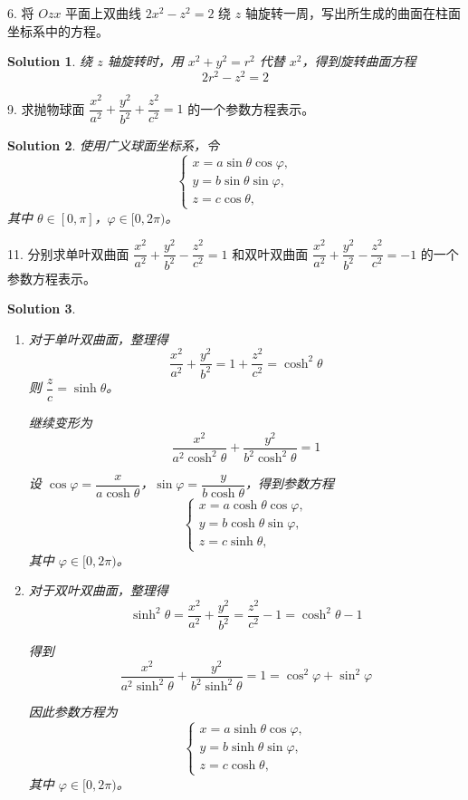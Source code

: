 \documentclass[a4paper,12pt]{article}
\newtheorem*{sol}{Solution}
\begin{document}
6. 将 $Ozx$ 平面上双曲线 $2x^2 - z^2 = 2$ 绕 $z$ 轴旋转一周，写出所生成的曲面在柱面坐标系中的方程。

\begin{sol}
    绕 $z$ 轴旋转时，用 $x^2 + y^2 = r^2$ 代替 $x^2$，得到旋转曲面方程
    $$2r^2 - z^2 = 2$$
\end{sol}

9. 求抛物球面 $\dfrac{x^2}{a^2} + \dfrac{y^2}{b^2} + \dfrac{z^2}{c^2} = 1$ 的一个参数方程表示。

\begin{sol}
    使用广义球面坐标系，令
    $$\begin{cases}
            x = a\sin\theta\cos\varphi, \\
            y = b\sin\theta\sin\varphi, \\
            z = c\cos\theta,
        \end{cases}$$
    其中 $\theta \in [0, \pi]$，$\varphi \in [0, 2\pi)$。
\end{sol}

11. 分别求单叶双曲面 $\dfrac{x^2}{a^2} + \dfrac{y^2}{b^2} - \dfrac{z^2}{c^2} = 1$ 和双叶双曲面 $\dfrac{x^2}{a^2} + \dfrac{y^2}{b^2} - \dfrac{z^2}{c^2} = -1$ 的一个参数方程表示。

\begin{sol}
    \begin{enumerate}
        \item 对于单叶双曲面，整理得
              $$\frac{x^2}{a^2} + \frac{y^2}{b^2} = 1 + \frac{z^2}{c^2} = \cosh^2\theta$$
              则 $\dfrac{z}{c} = \sinh\theta$。

              继续变形为
              $$\frac{x^2}{a^2\cosh^2\theta} + \frac{y^2}{b^2\cosh^2\theta} = 1$$

              设 $\cos\varphi = \dfrac{x}{a\cosh\theta}$，$\sin\varphi = \dfrac{y}{b\cosh\theta}$，得到参数方程
              $$\begin{cases}
                      x = a\cosh\theta\cos\varphi, \\
                      y = b\cosh\theta\sin\varphi, \\
                      z = c\sinh\theta,
                  \end{cases}$$
              其中 $\varphi \in [0, 2\pi)$。

        \item 对于双叶双曲面，整理得
              $$\sinh^2\theta = \frac{x^2}{a^2} + \frac{y^2}{b^2} = \frac{z^2}{c^2} - 1 = \cosh^2\theta - 1$$

              得到
              $$\frac{x^2}{a^2\sinh^2\theta} + \frac{y^2}{b^2\sinh^2\theta} = 1 = \cos^2\varphi + \sin^2\varphi$$

              因此参数方程为
              $$\begin{cases}
                      x = a\sinh\theta\cos\varphi, \\
                      y = b\sinh\theta\sin\varphi, \\
                      z = c\cosh\theta,
                  \end{cases}$$
              其中 $\varphi \in [0, 2\pi)$。
    \end{enumerate}
\end{sol}
\end{document}
